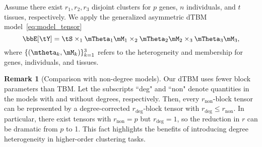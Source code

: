 \documentclass[lettersize,onecolumn,journal]{IEEEtran}
\theoremstyle{definition}
\theoremstyle{definition}
\newtheorem{example}{Example}
\newtheorem{rmk}{Remark}
\begin{document}
{Assume there exist $r_1, r_2, r_3$ disjoint clusters for $p$ genes, $n$ individuals, and $t$ tissues, respectively. We apply the generalized asymmetric dTBM model~\eqref{eq:model_tensor} 
\begin{equation}
    \bbE[\tY] = \tS \times_1 \mTheta_1 \mM_1 \times_2 \mTheta_2 \mM_2 \times_3 \mTheta_3 \mM_3, 
\end{equation}
where $\{(\mtheta_k, \mM_k)\}_{k=1}^3$ refers to the heterogeneity and membership for genes, individuals, and tissues. 




}


\begin{rmk}[Comparison with non-degree models]
Our dTBM uses fewer block parameters than TBM. Let the subscripts ``deg" and ``non" denote quantities in the models with and without degrees, respectively. Then, every $r_{\text{non}}$-block tensor can be represented by a degree-corrected $r_{\text{deg}}$-block tensor with $r_{\text{deg}}\leq r_{\text{non}}$. In particular, there exist tensors with $r_{\text{non}}=p$ but $r_{\text{deg}}=1$, so the reduction in $r$ can be dramatic from $p$ to 1. This fact highlights the benefits of introducing degree heterogeneity in higher-order clustering tasks.
\end{rmk}
\end{document}

